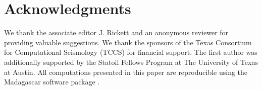 \section{Acknowledgments}
We thank the associate editor J. Rickett and an anonymous reviewer for providing valuable suggestions.
We thank the sponsors of the Texas Consortium for Computational Seismology (TCCS) for financial support.
The first author was additionally supported by the Statoil Fellows Program at The University of Texas at Austin.
All computations presented in this paper are reproducible using the Madagascar software package \cite[]{fomel13}.

\onecolumn


